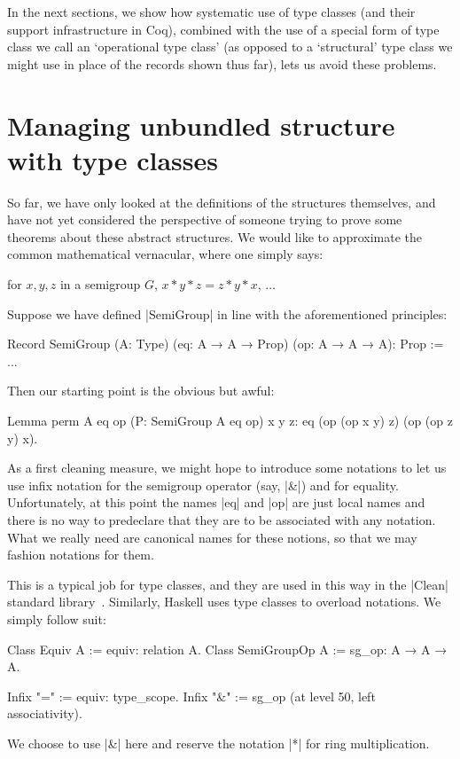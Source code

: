 \documentclass[a4paper,10pt, runningheads]{llncs}
\begin{document}
In the next sections, we show how systematic use of type classes (and their support infrastructure
in Coq), combined with the use of a special form of type class we call an `operational type class'
(as opposed to a `structural' type class we might use in place of the records shown thus far), lets
us avoid these problems.

\section{Managing unbundled structure with type classes}

So far, we have only looked at the definitions of the structures themselves, and have not yet
considered the perspective of someone trying to prove some theorems about these abstract structures.
We would like to approximate the common mathematical vernacular, where one
simply says:

for $x, y, z$ in a semigroup $G$, $x * y * z = z * y * x$, $\ldots$

Suppose we have defined |SemiGroup| in line with the aforementioned principles:
\begin{code}
Record SemiGroup (A: Type) (eq: A → A → Prop)
 (op: A → A → A): Prop := ...
\end{code}
Then our starting point is the obvious but awful:
\begin{code}
Lemma perm A eq op (P: SemiGroup A eq op) x y z:
                   eq (op (op x y) z) (op (op z y) x).
\end{code}
As a first cleaning measure, we might hope to introduce some notations to let us use infix notation
for the semigroup operator (say, |&|) and for equality. Unfortunately, at this point the names |eq|
and |op| are just local names and there is no way to predeclare that they are to be associated with
any notation. What we really need are canonical names for these notions, so that we may fashion
notations for them.

This is a typical job for type classes, and they are used in this way in the |Clean| standard
library~\cite{Clean}. Similarly, Haskell uses type classes to overload notations.
We simply follow suit:
\begin{code}
  Class Equiv A := equiv: relation A.
  Class SemiGroupOp A := sg_op: A → A → A.

  Infix "=" := equiv: type_scope.
  Infix "&" := sg_op (at level 50, left associativity).
\end{code}
We choose to use |&| here and reserve the notation |*| for ring multiplication.
\end{document}
